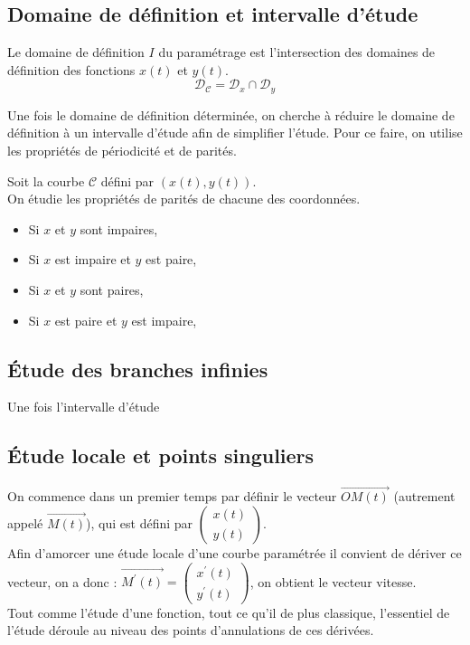 \subsection{Domaine de définition et intervalle d'étude}
\begin{defi}
Le domaine de définition $I$ du paramétrage est l'intersection des domaines de définition des fonctions $x(t)$ et $y(t)$.
$$\mathscr{D}_\mathscr{C}=\mathscr{D}_x\cap\mathscr{D}_y$$
\end{defi}
Une fois le domaine de définition déterminée, on cherche à réduire le domaine de définition à un intervalle d'étude afin de simplifier l'étude.
Pour ce faire, on utilise les propriétés de périodicité et de parités.
\begin{prop}
Soit la courbe $\mathscr{C}$ défini par $(x(t),y(t))$.\\
On étudie les propriétés de parités de chacune des coordonnées.
\begin{itemize}
    \item Si $x$ et $y$ sont impaires,
    \item Si $x$ est impaire et $y$ est paire,
    \item Si $x$ et $y$ sont paires,
    \item Si $x$ est paire et $y$ est impaire,
\end{itemize}
\end{prop}
\subsection{Étude des branches infinies}
Une fois l'intervalle d'étude
\subsection{Étude locale et points singuliers}
On commence dans un premier temps par  définir le vecteur $\overrightarrow{OM(t)}$ (autrement appelé $\overrightarrow{M(t)}$), qui est défini par $\begin{pmatrix}x(t)\\y(t)\end{pmatrix}$.\\
Afin d'amorcer une étude locale d'une courbe paramétrée il convient de dériver ce vecteur, on a donc : $\overrightarrow{M^{\prime}(t)}=\begin{pmatrix}x^{\prime}(t)\\y^{\prime}(t)\end{pmatrix}$, on obtient le vecteur vitesse.\\
Tout comme l'étude d'une fonction, tout ce qu'il de plus classique, l'essentiel de l'étude déroule au niveau des points d'annulations de ces dérivées.
